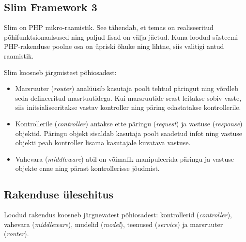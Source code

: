 \documentclass[a4paper,12pt]{article} %
\begin{document}
\subsection{Slim Framework 3}
Slim on PHP mikro-raamistik. See tähendab, et temas on realiseeritud põhifunktsionaalsused ning paljud lisad on välja jäetud. Kuna loodud süsteemi PHP-rakenduse poolne osa on üpriski õhuke ning lihtne, siis valitigi antud raamistik.\par
Slim koosneb järgmistest põhiosadest:
\begin{itemize}
\item Marsruuter (\textit{router}) analüüsib kasutaja poolt tehtud päringut ning võrdleb seda defineeritud masrtuutidega. Kui marsruutide seast leitakse sobiv vaste, siis initsialiseeritakse vastav kontroller ning päring edastatakse kontrollerile.
\item Kontrollerile (\textit{controller}) antakse ette päringu (\textit{request}) ja vastuse (\textit{response}) objektid. Päringu objekt sisaldab kasutaja poolt saadetud infot ning vastuse objekti peab kontroller lisama kasutajale kuvatava vastuse.
\item Vahevara (\textit{middleware}) abil on võimalik manipuleerida päringu ja vastuse objekte enne ning pärast kontrollerisse jõudmist.
\end{itemize}
\cite{SlimFW}
\subsection{Rakenduse ülesehitus}
Loodud rakendus koosneb järgnevatest põhiosadest: kontrollerid (\textit{controller}), vahevara (\textit{middleware}), mudelid (\textit{model}), teenused (\textit{service}) ja marsruuter (\textit{router}).
\end{document}
